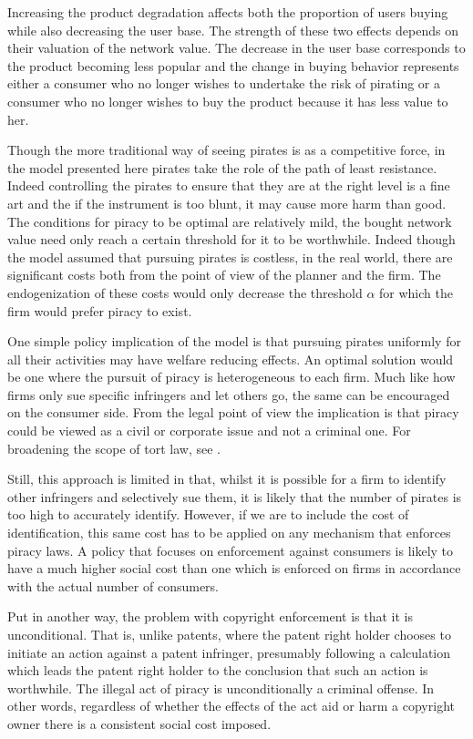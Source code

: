 Increasing the product degradation affects both the proportion of users buying while also decreasing the user base. The strength of these two effects depends on their valuation of the network value. The decrease in the user base corresponds to the product becoming less popular and the change in buying behavior represents either a consumer who no longer wishes to undertake the risk of pirating or a consumer who no longer wishes to buy the product because it has less value to her.

Though the more traditional way of seeing pirates is as a competitive force, in the model presented here pirates take the role of the path of least resistance. Indeed controlling the pirates to ensure that they are at the right level is a fine art and the if the instrument is too blunt, it may cause more harm than good. The conditions for piracy to be optimal are relatively mild, the bought network value need only reach a certain threshold for it to be worthwhile. Indeed though the model assumed that pursuing pirates is costless, in the real world, there are significant costs both from the point of view of the planner and the firm. The endogenization of these costs would only decrease the threshold $\alpha$ for which the firm would prefer piracy to exist.

One simple policy implication of the model is that pursuing pirates uniformly for all their activities may have welfare reducing effects. An optimal solution would be one where the pursuit of piracy is  heterogeneous to each firm. Much like how firms only sue specific infringers and let others go, the same can be encouraged on the consumer side. From the legal point of view the implication is that piracy could be viewed as a civil or corporate issue and not a criminal one. For broadening the scope of tort law, see \citep{DF96}. 

Still, this approach is limited in that, whilst it is possible for a firm to identify other infringers and selectively sue them, it is likely that the number of pirates is too high to accurately identify. However, if we are to include the cost of identification, this same cost has to be applied on any mechanism that enforces piracy laws. A policy that focuses on enforcement against consumers is likely to have a much higher social cost than one which is enforced on firms in accordance with the actual number of consumers. 

Put in another way, the problem with copyright enforcement is that it is unconditional. That is, unlike patents, where the patent right holder chooses to initiate an action against a patent infringer, presumably following a calculation which leads the patent right holder to the conclusion that such an action is worthwhile. The illegal act of piracy is unconditionally a criminal offense. In other words, regardless of whether the effects of the act aid or harm a copyright owner there is a consistent social cost imposed. 

